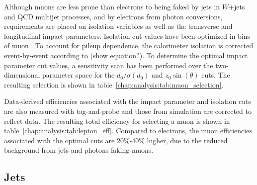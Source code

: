 Although muons are less prone than electrons to being faked by jets in $W$+jets and
QCD multijet processes, and by electrons from photon conversions,
requirements are placed on isolation variables as well as
the transverse and longitudinal impact parameters. Isolation cut
values have been optimized in bins of muon \pt. To account for pileup
dependence, the calorimeter isolation is corrected event-by-event
according to \nvtx (show equation?). To determine the
optimal impact parameter cut values, a sensitivity scan has been
performed over the two-dimensional parameter space for the
$d_0/\sigma{(d_0)}$ and $z_0\sin(\theta)$ cuts. The resulting
selection is shown in table~\ref{chap:analysis:tab:muon_selection}.

\begin{table}[h]
\centering
\renewcommand{\arraystretch}{1.1}
\caption[Muon selection summary in \pt~bins.]{Muon selection summary in
  \pt~bins.}
\label{chap:analysis:tab:muon_selection}
\end{table}

Data-derived efficiencies associated with the impact parameter and isolation cuts
are also measured with tag-and-probe and those from simulation are
corrected to reflect data. The resulting total efficiency for
selecting a muon is shown in
table~\ref{chap:analysis:tab:lepton_eff}. Compared to electrons, the
muon efficiencies associated with the optimal cuts are 20\%-40\%
higher, due to the reduced background from jets and photons faking
muons.

\subsection{Jets}

